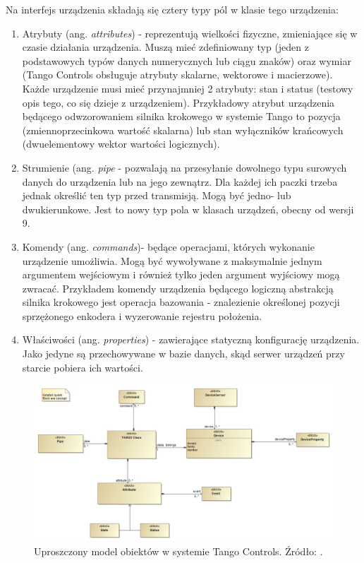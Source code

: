Na interfejs urządzenia składają się cztery typy pól w klasie tego urządzenia:
\begin{enumerate}
    \item Atrybuty (ang. \emph{attributes}) - reprezentują wielkości fizyczne, zmieniające się w czasie działania urządzenia. Muszą mieć zdefiniowany typ (jeden z podstawowych typów danych numerycznych lub ciągu znaków) oraz wymiar (Tango Controls obsługuje atrybuty skalarne, wektorowe i macierzowe). Każde urządzenie musi mieć przynajmniej 2 atrybuty: stan i status (testowy opis tego, co się dzieje z urządzeniem). Przykładowy atrybut urządzenia będącego odwzorowaniem silnika krokowego w systemie Tango to pozycja (zmiennoprzecinkowa wartość skalarna) lub stan wyłączników krańcowych (dwuelementowy wektor wartości logicznych).
    
    \item Strumienie (ang. \emph{pipe} - pozwalają na przesyłanie dowolnego typu surowych danych do urządzenia lub na jego zewnątrz. Dla każdej ich paczki trzeba jednak określić ten typ przed transmisją. Mogą być jedno- lub dwukierunkowe. Jest to nowy typ pola w klasach urządzeń, obecny od wersji 9.
    
    \item Komendy (ang. \emph{commands})- będące operacjami, których wykonanie urządzenie umożliwia. Mogą być wywoływane z maksymalnie jednym argumentem wejściowym i również tylko jeden argument wyjściowy mogą zwracać. Przykładem komendy urządzenia będącego logiczną abstrakcją silnika krokowego jest operacja bazowania - znalezienie określonej pozycji sprzężonego enkodera i wyzerowanie rejestru położenia.
    
    \item Właściwości (ang. \emph{properties}) - zawierające statyczną konfigurację urządzenia. Jako jedyne są przechowywane w bazie danych, skąd serwer urządzeń przy starcie pobiera ich wartości.
\end{enumerate}

\begin{figure}[tph]
    \centering
    \includegraphics[width=\textwidth]{Grafika/tango_model}
    \caption{Uproszczony model obiektów w systemie Tango Controls. Źródło: \cite{TangoDocs}.}
    \label{fig:tango-model}
\end{figure}

